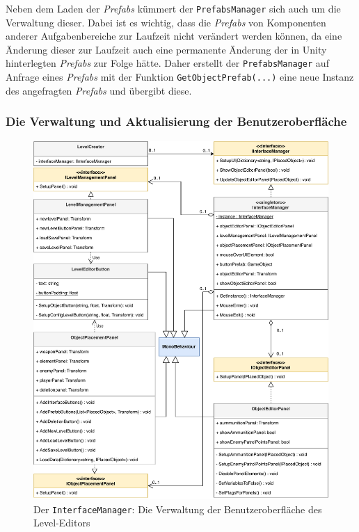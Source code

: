 Neben dem Laden der \textit{Prefabs} kümmert der \texttt{PrefabsManager} sich auch um die Verwaltung dieser. Dabei ist es wichtig, dass die \textit{Prefabs} von Komponenten anderer Aufgabenbereiche zur Laufzeit nicht verändert werden können, da eine Änderung dieser zur Laufzeit auch eine permanente Änderung der in Unity hinterlegten \textit{Prefabs} zur Folge hätte. Daher erstellt der \texttt{PrefabsManager} auf Anfrage eines \textit{Prefabs} mit der Funktion \texttt{GetObjectPrefab(...)} eine neue Instanz des angefragten \textit{Prefabs} und übergibt diese. 

\subsubsection{Die Verwaltung und Aktualisierung der Benutzeroberfläche}

\begin {figure}[H]
	\begin {center}
	    \includegraphics[width=1\textwidth]{pics/leveleditor_interfacemanager.pdf}
		\caption{Der \texttt{InterfaceManager}: Die Verwaltung der Benutzeroberfläche des Level-Editors}
		\label{fig:interfacemanager}
	\end {center}
\end {figure}

